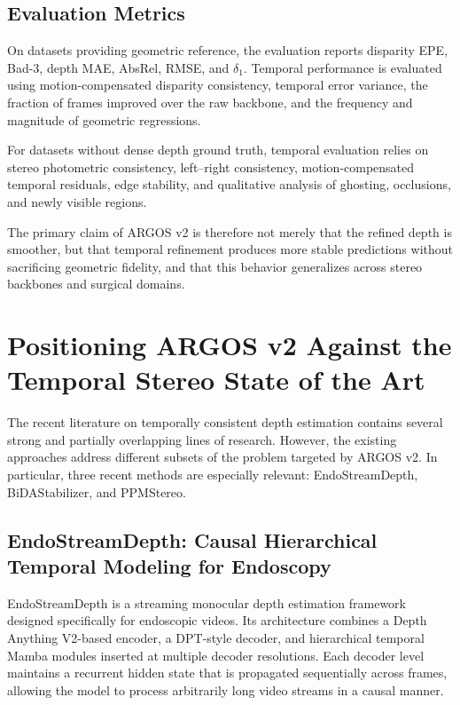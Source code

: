 \documentclass[11pt,a4paper]{article}
\begin{document}
\subsection{Evaluation Metrics}

On datasets providing geometric reference, the evaluation reports disparity EPE, Bad-3,
depth MAE, AbsRel, RMSE, and $\delta_1$. Temporal performance is evaluated using
motion-compensated disparity consistency, temporal error variance, the fraction of frames
improved over the raw backbone, and the frequency and magnitude of geometric regressions.

For datasets without dense depth ground truth, temporal evaluation relies on stereo
photometric consistency, left--right consistency, motion-compensated temporal residuals,
edge stability, and qualitative analysis of ghosting, occlusions, and newly visible regions.

The primary claim of ARGOS v2 is therefore not merely that the refined depth is smoother,
but that temporal refinement produces more stable predictions without sacrificing geometric
fidelity, and that this behavior generalizes across stereo backbones and surgical domains.

\section{Positioning ARGOS v2 Against the Temporal Stereo State of the Art}
\label{sec:argos_v2_positioning}

The recent literature on temporally consistent depth estimation contains several strong and partially overlapping lines of research. However, the existing approaches address different subsets of the problem targeted by ARGOS v2. In particular, three recent methods are especially relevant: EndoStreamDepth, BiDAStabilizer, and PPMStereo.

\subsection{EndoStreamDepth: Causal Hierarchical Temporal Modeling for Endoscopy}

EndoStreamDepth is a streaming monocular depth estimation framework designed specifically for endoscopic videos. Its architecture combines a Depth Anything V2-based encoder, a DPT-style decoder, and hierarchical temporal Mamba modules inserted at multiple decoder resolutions. Each decoder level maintains a recurrent hidden state that is propagated sequentially across frames, allowing the model to process arbitrarily long video streams in a causal manner.
\end{document}

